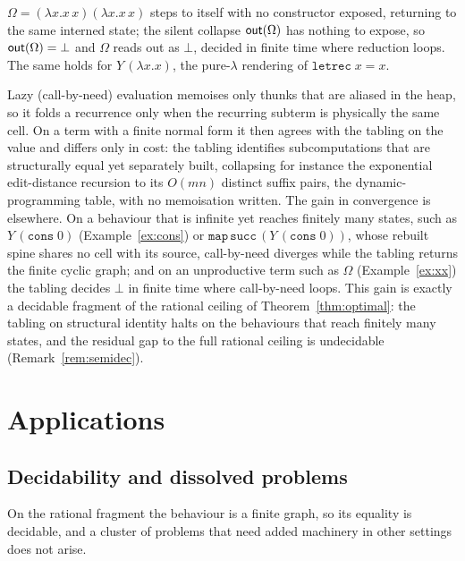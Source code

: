 \begin{example}\label{ex:xx}
  $\Omega = (\lambda x.x\,x)(\lambda x.x\,x)$ steps to itself with no constructor exposed, returning to
  the same interned state; the silent collapse $\mathsf{out}(\Omega)$ has nothing to expose, so $\mathsf{out}(\Omega)
  = \bot$ and $\Omega$ reads out as $\bot$, decided in finite time where reduction loops. The same holds
  for $Y\,(\lambda x.x)$, the pure-$\lambda$ rendering of $\mathtt{letrec}\;x = x$.
\end{example}

\begin{remark}\label{rem:callbyneed}
Lazy (call-by-need) evaluation memoises only thunks that are aliased in the heap, so it folds a
recurrence only when the recurring subterm is physically the same cell. On a term with a finite normal
form it then agrees with the tabling on the value and differs only in cost: the tabling identifies
subcomputations that are structurally equal yet separately built, collapsing for instance the
exponential edit-distance recursion to its $O(mn)$ distinct suffix pairs, the dynamic-programming
table, with no memoisation written. The gain in convergence is elsewhere. On a behaviour that is
infinite yet reaches finitely many states, such as $Y\,(\mathtt{cons}\;0)$ (Example~\ref{ex:cons}) or
$\mathtt{map}\,\mathtt{succ}\,(Y\,(\mathtt{cons}\;0))$, whose rebuilt spine shares no cell with its
source, call-by-need diverges while the tabling returns the finite cyclic graph; and on an
unproductive term such as $\Omega$ (Example~\ref{ex:xx}) the tabling decides $\bot$ in finite time
where call-by-need loops. This gain is exactly a decidable fragment of the rational ceiling of
Theorem~\ref{thm:optimal}: the tabling on structural identity halts on the behaviours that reach
finitely many states, and the residual gap to the full rational ceiling is undecidable
(Remark~\ref{rem:semidec}).
\end{remark}

\section{Applications}\label{sec:application}
\subsection{Decidability and dissolved problems}\label{sec:variants}
On the rational fragment the behaviour is a finite graph, so its equality is decidable, and a cluster
of problems that need added machinery in other settings does not arise.

